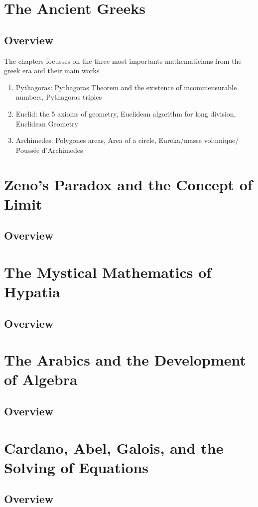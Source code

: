 \documentclass{article}
\begin{document}
\section{The Ancient Greeks}
\subsection{Overview}%
\label{sub:Overview}

The chapters focusses on the three most importants mathematicians from the
greek era and their main works
\begin{enumerate}
    \item Pythagoras: Pythagoras Theorem and the existence of incommensurable
	numbers, Pythagoras triples
    \item Euclid: the 5 axioms of geometry, Euclidean algorithm for long
	division, Euclidean Geometry
    \item Archimedes: Polygones areas, Area of a circle, Eureka/masse volumique/
	Poussée d'Archimedes
\end{enumerate}

\section{Zeno's Paradox and the Concept of Limit}
\subsection{Overview}%
\label{sub:Overview}
\section{The Mystical Mathematics of Hypatia}
\subsection{Overview}%
\label{sub:Overview}
\section{The Arabics and the Development of Algebra}
\subsection{Overview}%
\label{sub:Overview}
\section{Cardano, Abel, Galois, and the Solving of Equations}
\subsection{Overview}%
\label{sub:Overview}
\end{document}
